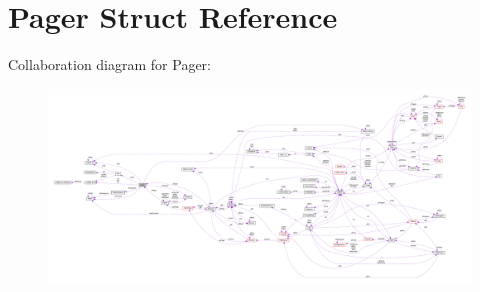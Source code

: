 \hypertarget{struct_pager}{\section{Pager Struct Reference}
\label{struct_pager}
}


Collaboration diagram for Pager\-:\nopagebreak
\begin{figure}[H]
\begin{center}
\leavevmode
\includegraphics[width=350pt]{struct_pager__coll__graph}
\end{center}
\end{figure}
